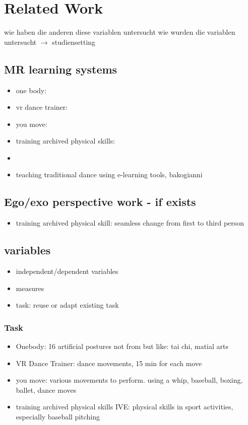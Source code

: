 \chapter{Related Work}
wie haben die anderen diese variablen untersucht
wie wurden die variablen untersucht $\rightarrow$ studiensetting
\section{MR learning systems}
\begin{itemize}
	\item one body:
	\item vr dance trainer:
	\item you move:
	\item training archived physical skills:
	\item
	\item teaching traditional dance using e-learning tools, bakogianni
\end{itemize}

\section{Ego/exo perspective work - if exists}
\begin{itemize}
	\item training archived physical skill: seamless change from first to third person
\end{itemize}
\section{variables}
\begin{itemize}
	\item independent/dependent variables
	\item measures
	\item task: reuse or adapt existing task
\end{itemize}
\subsection{Task}
\begin{itemize}
	\item Onebody: 16 artificial postures not from but like: tai chi, matial arts
	\item VR Dance Trainer: dance movements, 15 min for each move
	\item you move: various movements to perform. using a whip, baseball, boxing, ballet, dance moves
	\item training archived physical skills IVE: physical skills in sport activities, especially baseball pitching
\end{itemize}
